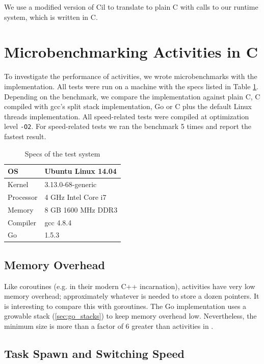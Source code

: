 \documentclass[acmsmall,anonymous,review]{acmart}\settopmatter{printfolios=true,printccs=false,printacmref=false}
\begin{document}
We use a modified version of Cil \cite{Necula2002} to translate \charcoal{} to plain C with calls to our runtime system, which is written in C.

\section{Microbenchmarking Activities in C}

To investigate the performance of activities, we wrote microbenchmarks with the \charcoal{} implementation.
All tests were run on a machine with the specs listed in Table \ref{table:specs}.
Depending on the benchmark, we compare the \charcoal{} implementation against plain C, C compiled with gcc's split stack implementation, Go or C plus the default Linux threads implementation.
All speed-related tests were compiled at optimization level \texttt{-O2}.
For speed-related tests we ran the benchmark 5 times and report the fastest result.

\begin{table}
  \centering
  \begin{tabular}{|l|l|}
    \hline
    OS & Ubuntu Linux 14.04 \\
    \hline
    Kernel & 3.13.0-68-generic \\
    \hline
    Processor & 4 GHz Intel Core i7 \\
    \hline
    Memory & 8 GB 1600 MHz DDR3 \\
    \hline
    Compiler & gcc 4.8.4 \\
    \hline
    Go & 1.5.3 \\
    \hline
  \end{tabular}
  \caption{Specs of the test system}
  \label{table:specs}
\end{table}

\subsection{Memory Overhead}

Like coroutines (e.g. in their modern C++ incarnation), activities have very low memory overhead; approximately whatever is needed to store a dozen pointers.
It is interesting to compare this with goroutines.
The Go implementation uses a growable stack (\textsection\ref{sec:go_stacks}) to keep memory overhead low.
Nevertheless, the minimum size is more than a factor of 6 greater than activities in \charcoal{}.

\subsection{Task Spawn and Switching Speed}
\end{document}
